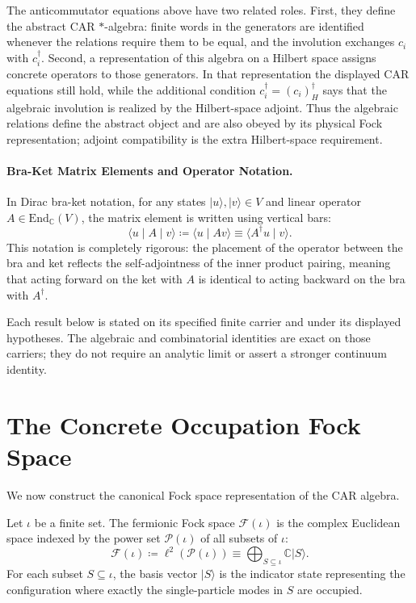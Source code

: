 The anticommutator equations above have two related roles. First, they define
the abstract CAR $*$-algebra: finite words in the generators are identified
whenever the relations require them to be equal, and the involution exchanges
$c_i$ with $c_i^\dagger$. Second, a representation of this algebra on a
Hilbert space assigns concrete operators to those generators. In that
representation the displayed CAR equations still hold, while the additional
condition $c_i^\dagger=(c_i)^\dagger_{\!H}$ says that the algebraic
involution is realized by the Hilbert-space adjoint. Thus the algebraic
relations define the abstract object and are also obeyed by its physical
Fock representation; adjoint compatibility is the extra Hilbert-space
requirement.

\paragraph{Bra-Ket Matrix Elements and Operator Notation.}
In Dirac bra-ket notation, for any states $|u\rangle, |v\rangle \in V$ and linear operator $A \in \mathrm{End}_{\mathbb{C}}(V)$, the matrix element is written using vertical bars:
\begin{equation}
\langle u \mid A \mid v \rangle \coloneqq \langle u \mid A v \rangle \equiv \langle A^\dagger u \mid v \rangle.
\end{equation}
This notation is completely rigorous: the placement of the operator between the bra and ket reflects the self-adjointness of the inner product pairing, meaning that acting forward on the ket with $A$ is identical to acting backward on the bra with $A^\dagger$.

\begin{remark}
Each result below is stated on its specified finite carrier and under its displayed hypotheses. The algebraic and combinatorial identities are exact on those carriers; they do not require an analytic limit or assert a stronger continuum identity.
\end{remark}

\section{The Concrete Occupation Fock Space}

We now construct the canonical Fock space representation of the CAR algebra.

\begin{definition}
Let $\iota$ be a finite set. The fermionic Fock space $\mathcal{F}(\iota)$ is the complex Euclidean space indexed by the power set $\mathcal{P}(\iota)$ of all subsets of $\iota$:
\begin{equation}
\mathcal{F}(\iota) \coloneqq \ell^2(\mathcal{P}(\iota)) \equiv \bigoplus_{S \subseteq \iota} \mathbb{C} |S\rangle.
\end{equation}
For each subset $S \subseteq \iota$, the basis vector $|S\rangle$ is the indicator state representing the configuration where exactly the single-particle modes in $S$ are occupied.
\end{definition}

